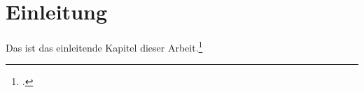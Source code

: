 \section{Einleitung}\label{sec:einleitung}

Das ist das einleitende Kapitel dieser Arbeit.\footcite[347]{einstein}